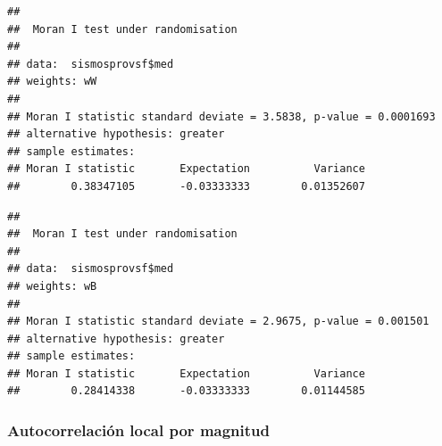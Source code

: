 \documentclass[11pt,]{article}
\newenvironment{Shaded}{\begin{snugshade}}{\end{snugshade}}
\newcommand{\KeywordTok}[1]{\textcolor[rgb]{0.13,0.29,0.53}{\textbf{#1}}}
\newcommand{\DataTypeTok}[1]{\textcolor[rgb]{0.13,0.29,0.53}{#1}}
\newcommand{\StringTok}[1]{\textcolor[rgb]{0.31,0.60,0.02}{#1}}
\newcommand{\OperatorTok}[1]{\textcolor[rgb]{0.81,0.36,0.00}{\textbf{#1}}}
\newcommand{\NormalTok}[1]{#1}
\begin{document}
\begin{Shaded}
\end{Shaded}

\begin{verbatim}
## 
##  Moran I test under randomisation
## 
## data:  sismosprovsf$med  
## weights: wW    
## 
## Moran I statistic standard deviate = 3.5838, p-value = 0.0001693
## alternative hypothesis: greater
## sample estimates:
## Moran I statistic       Expectation          Variance 
##        0.38347105       -0.03333333        0.01352607
\end{verbatim}

\begin{Shaded}
\end{Shaded}

\begin{verbatim}
## 
##  Moran I test under randomisation
## 
## data:  sismosprovsf$med  
## weights: wB    
## 
## Moran I statistic standard deviate = 2.9675, p-value = 0.001501
## alternative hypothesis: greater
## sample estimates:
## Moran I statistic       Expectation          Variance 
##        0.28414338       -0.03333333        0.01144585
\end{verbatim}

\subsubsection{Autocorrelación local por
magnitud}\label{autocorrelaciuxf3n-local-por-magnitud-1}

\begin{Shaded}
\end{Shaded}
\end{document}
